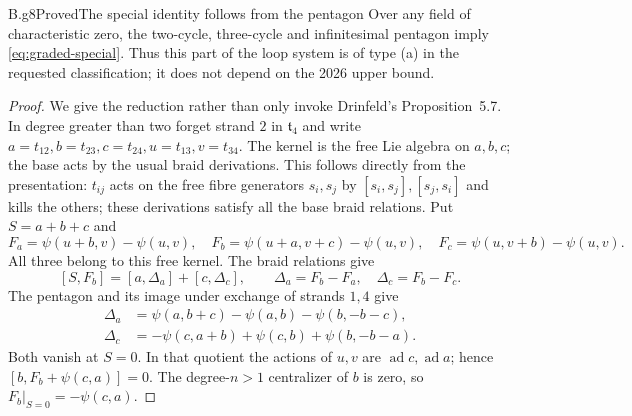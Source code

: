 \begin{claim}{B.g8}{Proved}{The special identity follows from the pentagon}
Over any field of characteristic zero, the two-cycle, three-cycle and
infinitesimal pentagon imply \eqref{eq:graded-special}.  Thus this
part of the loop system is of type (a) in the requested classification;
it does not depend on the 2026 upper bound.
\end{claim}

\begin{proof}
We give the reduction rather than only invoke Drinfeld's
Proposition~5.7.  In degree greater than two forget strand $2$ in
$\mathfrak t_4$ and write
$a=t_{12},b=t_{23},c=t_{24},u=t_{13},v=t_{34}$.
The kernel is the free Lie algebra on $a,b,c$; the base acts by the
usual braid derivations.  This follows directly from the presentation:
$t_{ij}$ acts on the free fibre generators $s_i,s_j$ by
$[s_i,s_j],[s_j,s_i]$ and kills the others; these derivations satisfy
all the base braid relations.
Put $S=a+b+c$ and
\[
 F_a=\psi(u+b,v)-\psi(u,v),\quad
 F_b=\psi(u+a,v+c)-\psi(u,v),\quad
 F_c=\psi(u,v+b)-\psi(u,v).
\]
All three belong to this free kernel.  The braid relations give
\[
 [S,F_b]=[a,\Delta_a]+[c,\Delta_c],\qquad
 \Delta_a=F_b-F_a,\quad\Delta_c=F_b-F_c.
\]
The pentagon and its image under exchange of strands $1,4$ give
\begin{align*}
 \Delta_a&=\psi(a,b+c)-\psi(a,b)-\psi(b,-b-c),\\
 \Delta_c&=-\psi(c,a+b)+\psi(c,b)+\psi(b,-b-a).
\end{align*}
Both vanish at $S=0$.  In that quotient the actions of $u,v$ are
$\operatorname{ad}c,\operatorname{ad}a$; hence
$[b,F_b+\psi(c,a)]=0$.
The degree-$n>1$ centralizer of $b$ is zero, so
$F_b|_{S=0}=-\psi(c,a)$.


\end{proof}
